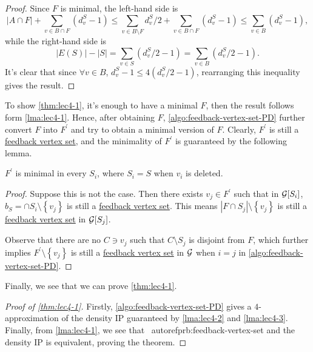 \begin{proof}
	Since \(F\) is minimal, the left-hand side is
	\[
		\left\vert A \cap  F \right\vert + \sum_{v\in B \cap F}(d_{v} ^S - 1) \leq \sum_{v\in B \setminus F} d_{v} ^S / 2 + \sum_{v\in B \cap F}(d_{v} ^S - 1) \leq \sum_{v\in B}(d_{v}^S - 1 ),
	\]
	while the right-hand side is
	\[
		\left\vert E(S) \right\vert - \left\vert S \right\vert = \sum_{v\in S}(d_{v} ^S / 2 - 1) = \sum_{v\in B} (d_{v} ^S / 2 - 1).
	\]
	It's clear that since \(\forall v\in B\), \(d_v^S - 1 \leq 4 (d_{v} ^S / 2 - 1)\), rearranging this inequality gives the result.
\end{proof}

To show \autoref{thm:lec4-1}, it's enough to have a minimal \(F\), then the result follows form \autoref{lma:lec4-1}. Hence, after obtaining \(F\), \autoref{algo:feedback-vertex-set-PD} further convert \(F\) into \(F^\prime \) and  try to obtain a minimal version of \(F\). Clearly, \(F^\prime \) is still a \hyperref[prb:feedback-vertex-set]{feedback vertex set}, and the minimality of \(F^\prime \) is guaranteed by the following lemma.

\begin{lemma}\label{lma:lec4-3}
	\(F^\prime \) is minimal in every \(S_i\), where \(S_i = S\) when \(v_i\) is deleted.
\end{lemma}
\begin{proof}
	Suppose this is not the case. Then there exists \(v_j\in F^\prime \) such that in \(\mathcal{\MakeUppercase{g}} [S_i]\), \(b_S= \cap S_i\setminus \left\{ v_{j}  \right\}\) is still a \hyperref[prb:feedback-vertex-set]{feedback vertex set}. This means \(\left\vert F \cap S_j \right\vert \setminus \left\{ v_{j}  \right\}  \) is still a \hyperref[prb:feedback-vertex-set]{feedback vertex set} in \(\mathcal{\MakeUppercase{g}} [S_j]\).

	Observe that there are no \(C\ni v_j\) such that \(C\setminus S_j\) is disjoint from \(F\), which further implies \(F^\prime \setminus \left\{ v_j \right\} \) is still a \hyperref[prb:feedback-vertex-set]{feedback vertex set} in \(\mathcal{\MakeUppercase{g}} \) when \(i = j\) in \autoref{algo:feedback-vertex-set-PD}.
\end{proof}

Finally, we see that we can prove \autoref{thm:lec4-1}.

\begin{proof}[Proof of \autoref{thm:lec4-1}]
	Firstly, \autoref{algo:feedback-vertex-set-PD} gives a \(4\)-approximation of the density IP guaranteed by \autoref{lma:lec4-2} and \autoref{lma:lec4-3}. Finally, from \autoref{lma:lec4-1}, we see that \ autoref{prb:feedback-vertex-set} and the density IP is equivalent, proving the theorem.
\end{proof}